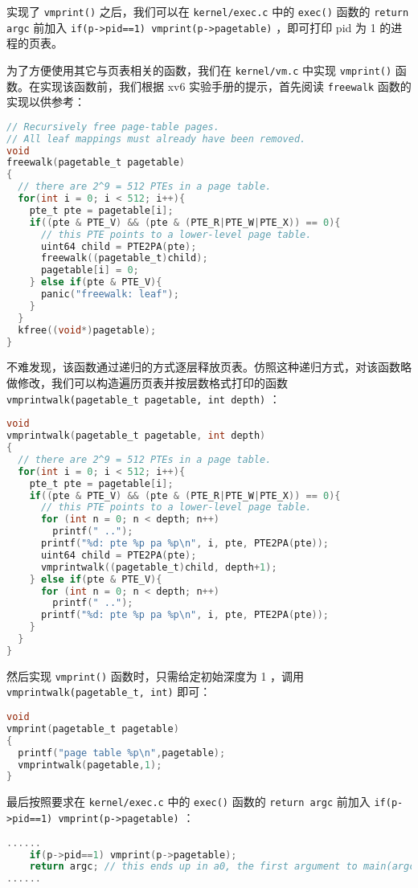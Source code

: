 实现了 \lstinline{vmprint()} 之后，我们可以在 \lstinline{kernel/exec.c} 中的 \lstinline{exec()} 函数的 \lstinline{return argc} 前加入 \lstinline{if(p->pid==1) vmprint(p->pagetable)} ，即可打印 pid 为 1 的进程的页表。

为了方便使用其它与页表相关的函数，我们在 \lstinline{kernel/vm.c} 中实现 \lstinline{vmprint()} 函数。在实现该函数前，我们根据 xv6 实验手册的提示，首先阅读 \lstinline{freewalk} 函数的实现以供参考：
\begin{lstlisting}[language=C]
// Recursively free page-table pages.
// All leaf mappings must already have been removed.
void
freewalk(pagetable_t pagetable)
{
  // there are 2^9 = 512 PTEs in a page table.
  for(int i = 0; i < 512; i++){
    pte_t pte = pagetable[i];
    if((pte & PTE_V) && (pte & (PTE_R|PTE_W|PTE_X)) == 0){
      // this PTE points to a lower-level page table.
      uint64 child = PTE2PA(pte);
      freewalk((pagetable_t)child);
      pagetable[i] = 0;
    } else if(pte & PTE_V){
      panic("freewalk: leaf");
    }
  }
  kfree((void*)pagetable);
}
\end{lstlisting}

不难发现，该函数通过递归的方式逐层释放页表。仿照这种递归方式，对该函数略做修改，我们可以构造遍历页表并按层数格式打印的函数 \lstinline{vmprintwalk(pagetable_t pagetable, int depth)} ：
\begin{lstlisting}[language=C]
void
vmprintwalk(pagetable_t pagetable, int depth)
{
  // there are 2^9 = 512 PTEs in a page table.
  for(int i = 0; i < 512; i++){
    pte_t pte = pagetable[i];
    if((pte & PTE_V) && (pte & (PTE_R|PTE_W|PTE_X)) == 0){
      // this PTE points to a lower-level page table.
      for (int n = 0; n < depth; n++)
        printf(" ..");
      printf("%d: pte %p pa %p\n", i, pte, PTE2PA(pte));
      uint64 child = PTE2PA(pte);
      vmprintwalk((pagetable_t)child, depth+1);
    } else if(pte & PTE_V){
      for (int n = 0; n < depth; n++)
        printf(" ..");
      printf("%d: pte %p pa %p\n", i, pte, PTE2PA(pte));
    }
  }
}
\end{lstlisting}

然后实现 \lstinline{vmprint()} 函数时，只需给定初始深度为 1 ，调用 \lstinline{vmprintwalk(pagetable_t, int)} 即可：
\begin{lstlisting}[language=C]
void
vmprint(pagetable_t pagetable)
{
  printf("page table %p\n",pagetable);
  vmprintwalk(pagetable,1);
}
\end{lstlisting}

最后按照要求在 \lstinline{kernel/exec.c} 中的 \lstinline{exec()} 函数的 \lstinline{return argc} 前加入 \lstinline{if(p->pid==1) vmprint(p->pagetable)} ：
\begin{lstlisting}[language=C]
......
    if(p->pid==1) vmprint(p->pagetable);
    return argc; // this ends up in a0, the first argument to main(argc, argv)
......
\end{lstlisting}

